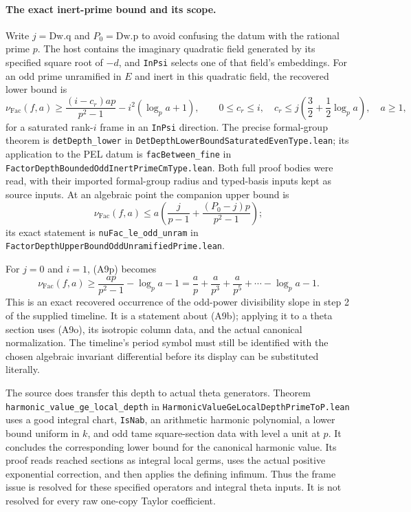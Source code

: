 \paragraph{The exact inert-prime bound and its scope.}
Write $j=\mathrm{Dw.q}$ and $P_0=\mathrm{Dw.p}$ to avoid
confusing the datum with the rational prime $p$.
The host contains the imaginary quadratic field generated
by its specified square root of $-d$, and
\texttt{InPsi} selects one of that field's embeddings.
For an odd prime unramified in $E$ and inert in this
quadratic field, the recovered lower bound is
\[
 \nu_{\mathrm{Fac}}(f,a)
 \geq
   \frac{(i-c_r)ap}{p^2-1}
       -i^2(\log_p a+1),\qquad
 0\leq c_r\leq i,\quad
 c_r\leq j\left(\frac32+\frac12\log_p a\right),
 \quad a\geq1,
 \tag{A9p}
\]
for a saturated rank-$i$ frame in an \texttt{InPsi} direction.
The precise formal-group theorem is
\texttt{detDepth\_lower} in
\texttt{DetDepthLowerBoundSaturatedEvenType.lean};
its application to the PEL datum is
\texttt{facBetween\_fine} in
\texttt{FactorDepthBoundedOddInertPrimeCmType.lean}.
Both full proof bodies were read, with their imported
formal-group radius and typed-basis inputs kept as source
inputs.  At an algebraic point the companion upper bound is
\[
 \nu_{\mathrm{Fac}}(f,a)
       \leq a\left(\frac{j}{p-1}
                    +\frac{(P_0-j)p}{p^2-1}\right);
 \tag{A9q}
\]
its exact statement is \texttt{nuFac\_le\_odd\_unram} in
\texttt{FactorDepthUpperBoundOddUnramifiedPrime.lean}.

For $j=0$ and $i=1$, (A9p) becomes
\[
 \nu_{\mathrm{Fac}}(f,a)
       \geq \frac{ap}{p^2-1}-\log_p a-1
       =\frac ap+\frac a{p^3}+\frac a{p^5}+\cdots
                                      -\log_p a-1.
 \tag{A9r}
\]
This is an exact recovered occurrence of the odd-power
divisibility slope in step 2 of the supplied timeline.
It is a statement about (A9b); applying it to a theta
section uses (A9o), its isotropic column data, and the
actual canonical normalization.
The timeline's period symbol must still be identified with
the chosen algebraic invariant differential before its
display can be substituted literally.

The source does transfer this depth to actual theta
generators.  Theorem
\texttt{harmonic\_value\_ge\_local\_depth} in
\texttt{HarmonicValueGeLocalDepthPrimeToP.lean}
uses a good integral chart, \texttt{IsNab}, an arithmetic
harmonic polynomial, a lower bound uniform in $k$, and
odd tame square-section data with level a unit at $p$.
It concludes the corresponding lower bound for the
canonical harmonic value.  Its proof reads reached
sections as integral local germs, uses the actual positive
exponential correction, and then applies the defining
infimum.  Thus the frame issue is resolved for these
specified operators and integral theta inputs.  It is
not resolved for every raw one-copy Taylor coefficient.

